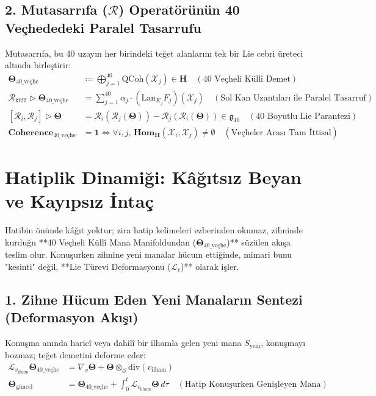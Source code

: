 \documentclass[11pt, a4paper]{article}
\begin{document}
\subsection{2. Mutasarrıfa ($\mathcal{R}$) Operatörünün 40 Veçhededeki Paralel Tasarrufu}
Mutasarrıfa, bu 40 uzayın her birindeki teğet alanlarını tek bir Lie cebri üreteci altında birleştirir:
\begin{align}
\mathbf{\Theta}_{\text{40\_veçhe}} &\coloneqq \bigoplus_{j=1}^{40} \text{QCoh}(\mathcal{X}_j) \in \mathbf{H} \quad (\text{40 Veçheli Küllî Demet}) \\
\mathcal{R}_{\text{küllî}} \triangleright \mathbf{\Theta}_{\text{40\_veçhe}} &= \sum_{j=1}^{40} \alpha_j \cdot \left( \text{Lan}_{K_j} F_j \right)(\mathcal{X}_j) \quad (\text{Sol Kan Uzantıları ile Paralel Tasarruf}) \\
[\mathcal{R}_i, \mathcal{R}_j] \triangleright \mathbf{\Theta} &= \mathcal{R}_i(\mathcal{R}_j(\mathbf{\Theta})) - \mathcal{R}_j(\mathcal{R}_i(\mathbf{\Theta})) \in \mathfrak{g}_{40} \quad (\text{40 Boyutlu Lie Parantezi}) \\
\mathbf{Coherence}_{\text{40\_veçhe}} &= \mathbf{1} \iff \forall i, j, \, \mathbf{Hom}_{\mathbf{H}}(\mathcal{X}_i, \mathcal{X}_j) \neq \emptyset \quad (\text{Veçheler Arası Tam İttisal})
\end{align}

\section{Hatiplik Dinamiği: Kâğıtsız Beyan ve Kayıpsız İntaç}

Hatibin önünde kâğıt yoktur; zira hatip kelimeleri ezberinden okumaz, zihninde kurduğu **40 Veçheli Küllî Mana Manifoldundan ($\mathbf{\Theta}_{\text{40\_veçhe}}$)** süzülen akışa teslim olur. Konuşurken zihnine yeni manalar hücum ettiğinde, mimari bunu "kesinti" değil, **Lie Türevi Deformasyonu ($\mathcal{L}_v$)** olarak işler.

\subsection{1. Zihne Hücum Eden Yeni Manaların Sentezi (Deformasyon Akışı)}
Konuşma anında haricî veya dahilî bir ilhamla gelen yeni mana $S_{\text{yeni}}$, konuşmayı bozmaz; teğet demetini deforme eder:
\begin{align}
\mathcal{L}_{v_{\text{ilham}}} \mathbf{\Theta}_{\text{40\_veçhe}} &= \nabla_{v} \mathbf{\Theta} + \mathbf{\Theta} \otimes_{\mathcal{O}} \text{div}(v_{\text{ilham}}) \\
\mathbf{\Theta}_{\text{güncel}} &= \mathbf{\Theta}_{\text{40\_veçhe}} + \int_0^t \mathcal{L}_{v_{\text{ilham}}} \mathbf{\Theta} \, d\tau \quad (\text{Hatip Konuşurken Genişleyen Mana})
\end{align}
\end{document}
